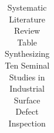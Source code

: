 \begin{longtable}{|>{\raggedright\arraybackslash}p{0.6cm}|>{\raggedright\arraybackslash}p{3.5cm}|>{\raggedright\arraybackslash}p{2.7cm}|>{\raggedright\arraybackslash}p{4.0cm}|>{\raggedright\arraybackslash}p{3.2cm}|}
\caption{Systematic Literature Review Table Synthesizing Ten Seminal Studies in Industrial Surface Defect Inspection}\label{tab:litmatrix}
\end{longtable}
\endgroup
